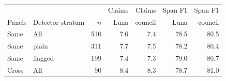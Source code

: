\begin{tabular}{@{}llrrrrr@{}}
\toprule
 & & & Claims & Claims & Span F1 & Span F1 \\
Panels & Detector stratum & $n$ & Luna & council & Luna & council \\
\midrule
Same & All & 510 & 7.6 & 7.4 & 78.5 & 80.5 \\
Same & plain & 311 & 7.7 & 7.5 & 78.2 & 80.4 \\
Same & flagged & 199 & 7.4 & 7.3 & 79.0 & 80.7 \\
Cross & All & 90 & 8.4 & 8.3 & 78.7 & 81.0 \\
\bottomrule
\end{tabular}
